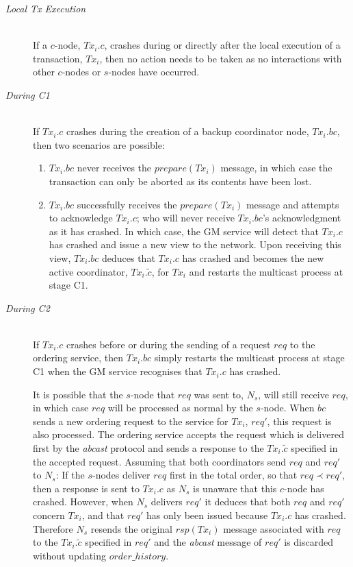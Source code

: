 	\begin{description}
         \item[\emph{Local Tx Execution}]  \hfill \\
         If a $c$-node, $Tx_i.c$, crashes during or directly after the local execution of a transaction, $Tx_i$, then no action needs to be taken as no interactions with other $c$-nodes or $s$-nodes have occurred.  
		
		\item[\emph{During C1}]  \hfill \\
		If $Tx_i.c$ crashes during the creation of a backup coordinator node, $Tx_i.bc$, then two scenarios are possible:
		    \begin{enumerate}[label=\roman*]
			    \item    $Tx_i.bc$ never receives the $prepare(Tx_i)$ message, in which case the transaction  can only be aborted as its contents have been lost.  
			    \item    $Tx_i.bc$ successfully receives the $prepare(Tx_i)$ message and attempts to acknowledge $Tx_i.c$; who will never receive $Tx_i.bc$'s acknowledgment as it has crashed.  In which case, the GM service will detect that $Tx_i.c$ has crashed and issue a new view to the network.  Upon receiving this view, $Tx_i.bc$ deduces that $Tx_i.c$ has crashed and becomes the new active coordinator, $Tx_i.\tilde{c}$, for $Tx_i$ and restarts the multicast process at stage C1.  
		    \end{enumerate}     
		    
		\item[\emph{During C2}]  \hfill \\
        If $Tx_i.c$ crashes before or during the sending of a request $req$ to the ordering service, then $Tx_i.bc$ simply restarts the multicast process at stage C1 when the GM service recognises that $Tx_i.c$ has crashed.  
        
        It is possible that the $s$-node that $req$ was sent to, $N_s$, will still receive $req$, in which case $req$ will be processed as normal by the $s$-node.  When $bc$ sends a new ordering request to the service for $Tx_i$, $req'$, this request is also processed.  The ordering service accepts the request which is delivered first by the \emph{abcast} protocol and sends a response to the $Tx_i.\tilde{c}$ specified in the accepted request.  Assuming that both coordinators send $req$ and $req'$ to $N_s$: If the $s$-nodes deliver $req$ first in the total order, so that $req \prec req'$, then a response is sent to $Tx_i.c$ as $N_s$ is unaware that this $c$-node has crashed.  However, when $N_s$ delivers $req'$ it deduces that both $req$ and $req'$ concern $Tx_i$, and that $req'$ has only been issued because $Tx_i.c$ has crashed.  Therefore $N_s$ resends the original $rsp(Tx_i)$ message associated with $req$ to the $Tx_i.\tilde{c}$ specified in $req'$ and the \emph{abcast} message of $req'$ is discarded without updating $order\_history$.  
        

\end{description}
